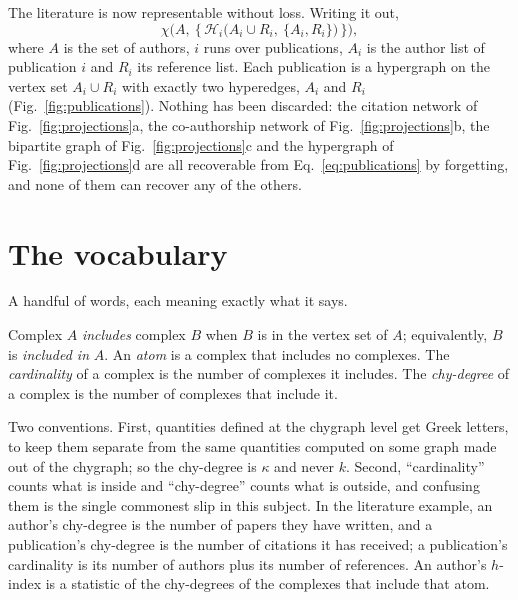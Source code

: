The literature is now representable without loss. Writing it out,
\begin{equation}
  \chi\Big(A,\ \big\{\,\mathcal{H}_i\big(A_i\cup R_i,\ \{A_i,R_i\}\big)\,\big\}\Big),
  \label{eq:publications}
\end{equation}
where $A$ is the set of authors, $i$ runs over publications, $A_i$ is the
author list of publication $i$ and $R_i$ its reference list. Each publication is
a hypergraph on the vertex set $A_i\cup R_i$ with exactly two hyperedges,
$A_i$ and $R_i$ (Fig.~\ref{fig:publications}). Nothing has been discarded: the
citation network of Fig.~\ref{fig:projections}a, the co-authorship network of
Fig.~\ref{fig:projections}b, the bipartite graph of
Fig.~\ref{fig:projections}c and the hypergraph of Fig.~\ref{fig:projections}d
are all recoverable from Eq.~\eqref{eq:publications} by forgetting, and none of
them can recover any of the others.

\section{The vocabulary}
\label{sec:vocabulary}

A handful of words, each meaning exactly what it says.

Complex $A$ \emph{includes} complex $B$ when $B$ is in the vertex set of $A$;
equivalently, $B$ is \emph{included in} $A$. An \emph{atom} is a complex that
includes no complexes. The \emph{cardinality} of a complex is the number of
complexes it includes. The \emph{chy-degree} of a complex is the number of
complexes that include it.

Two conventions. First, quantities defined at the
chygraph level get Greek letters, to keep them separate from the same quantities
computed on some graph made out of the chygraph; so the chy-degree is $\kappa$
and never $k$. Second, ``cardinality'' counts what is inside and ``chy-degree''
counts what is outside, and confusing them is the single commonest slip in this
subject. In the literature example, an author's chy-degree is the number of
papers they have written, and a publication's chy-degree is the number of
citations it has received; a publication's cardinality is its number of authors
plus its number of references. An author's $h$-index is a statistic of the
chy-degrees of the complexes that include that atom.

